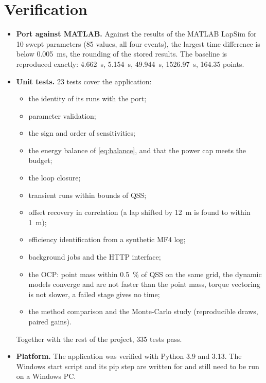 \documentclass[11pt]{article}
\begin{document}
\section{Verification}\label{sec:verification}
\begin{itemize}
  \item \textbf{Port against MATLAB.} Against the results of the MATLAB LapSim for 10 swept parameters (85
        values, all four events), the largest time difference is below \SI{0.005}{ms}, the rounding of the
        stored results. The baseline is reproduced exactly: \SI{4.662}{s}, \SI{5.154}{s}, \SI{49.944}{s},
        \SI{1526.97}{s}, 164.35 points.
  \item \textbf{Unit tests.} 23 tests cover the application:
        \begin{itemize}
          \item the identity of its runs with the port;
          \item parameter validation;
          \item the sign and order of sensitivities;
          \item the energy balance of \cref{eq:balance}, and that the power cap meets the budget;
          \item the loop closure;
          \item transient runs within bounds of QSS;
          \item offset recovery in correlation (a lap shifted by \SI{12}{m} is found to within \SI{1}{m});
          \item efficiency identification from a synthetic MF4 log;
          \item background jobs and the HTTP interface;
          \item the OCP: point mass within \SI{0.5}{\%} of QSS on the same grid, the dynamic models converge and are
                not faster than the point mass, torque vectoring is not slower, a failed stage gives no time;
          \item the method comparison and the Monte-Carlo study (reproducible draws, paired gains).
        \end{itemize}
        Together with the rest of the project, 335 tests pass.
  \item \textbf{Platform.} The application was verified with Python 3.9 and 3.13. The Windows start script and
        its pip step are written for  and still need to be run on a Windows PC.
\end{itemize}
\end{document}
